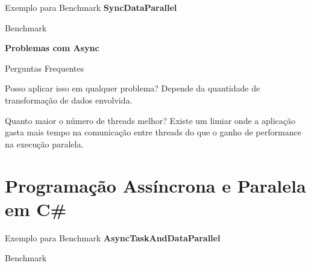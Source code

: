 \documentclass[10pt]{beamer}
\begin{document}
\begin{frame}{Exemplo para Benchmark}
	\textbf{SyncDataParallel}
\end{frame}

\begin{frame}{Benchmark}
	\begin{figure}
	\end{figure}
	\textbf{Problemas com Async}
\end{frame}


\begin{frame}{Perguntas Frequentes}
	\begin{exampleblock}{Posso aplicar isso em qualquer problema?}
		Depende da quantidade de transformação de dados envolvida.
	\end{exampleblock}
	\begin{exampleblock}{Quanto maior o número de threads melhor?}
		Existe um limiar onde a aplicação gasta mais tempo na comunicação entre threads do que o ganho de performance na execução paralela.
	\end{exampleblock}
\end{frame}

\section{Programação Assíncrona e Paralela em C\#}

\begin{frame}{Exemplo para Benchmark}
	\textbf{AsyncTaskAndDataParallel}
\end{frame}

\begin{frame}{Benchmark}
	\begin{figure}
	\end{figure}
\end{frame}
\end{document}

